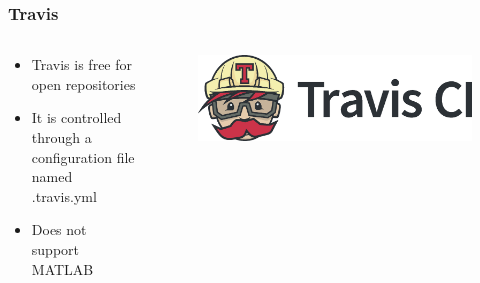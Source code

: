 \begin{frame}
	\frametitle{Travis}
	\begin{columns}
		\begin{column}{0.4\textwidth}
			\begin{itemize}[<+->]
				\item Travis is free for open repositories
				\item It is controlled through a configuration file named .travis.yml
				\item Does not support MATLAB
			\end{itemize}
		\end{column}
		\begin{column}{0.6\textwidth}
			\begin{figure}
				\centering
				\includegraphics[width=\textwidth]{./pictures/Travis.eps}
			\end{figure}
		\end{column}
	\end{columns}
\end{frame}
